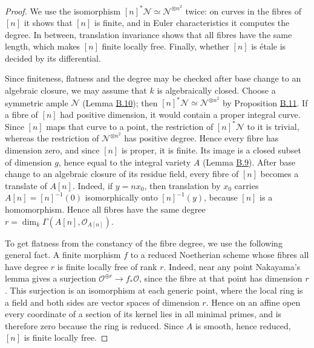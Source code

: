 \documentclass[11pt]{article}
\begin{document}
\begin{proof}[{Proof}]\label{bp109}%
We use the isomorphism \([n]^*\mathcal N\simeq\mathcal N^{\otimes n^2}\) twice: on curves in the fibres of \([n]\) it shows that \([n]\) is finite, and in Euler characteristics it computes the degree. In between, translation invariance shows that all fibres have the same length, which makes \([n]\) finite locally free. Finally, whether \([n]\) is étale is decided by its differential.

Since finiteness, flatness and the degree may be checked after base change to an algebraic closure, we may assume that \(k\) is algebraically closed. Choose a symmetric ample \(\mathcal N\) (Lemma \hyperref[bp103]{B.10}); then \([n]^*\mathcal N\simeq\mathcal N^{\otimes n^2}\) by Proposition \hyperref[bp105]{B.11}. If a fibre of \([n]\) had positive dimension, it would contain a proper integral curve. Since \([n]\) maps that curve to a point, the restriction of \([n]^*\mathcal N\) to it is trivial, whereas the restriction of \(\mathcal N^{\otimes n^2}\) has positive degree. Hence every fibre has dimension zero, and since \([n]\) is proper, it is finite. Its image is a closed subset of dimension \(g\), hence equal to the integral variety \(A\) (Lemma \hyperref[bp100]{B.9}). After base change to an algebraic closure of its residue field, every fibre of \([n]\) becomes a translate of \(A[n]\). Indeed, if \(y=nx_0\), then translation by \(x_0\) carries \(A[n]=[n]^{-1}(0)\) isomorphically onto \([n]^{-1}(y)\), because \([n]\) is a homomorphism. Hence all fibres have the same degree \(r=\dim_k\Gamma(A[n],\mathcal O_{A[n]})\).

To get flatness from the constancy of the fibre degree, we use the following general fact. A finite morphism \(f\) to a reduced Noetherian scheme whose fibres all have degree \(r\) is finite locally free of rank \(r\). Indeed, near any point Nakayama's lemma gives a surjection \(\mathcal O^{\oplus r}\to f_*\mathcal O\), since the fibre at that point has dimension \(r\). This surjection is an isomorphism at each generic point, where the local ring is a field and both sides are vector spaces of dimension \(r\). Hence on an affine open every coordinate of a section of its kernel lies in all minimal primes, and is therefore zero because the ring is reduced. Since \(A\) is smooth, hence reduced, \([n]\) is finite locally free.


\end{proof}
\end{document}
